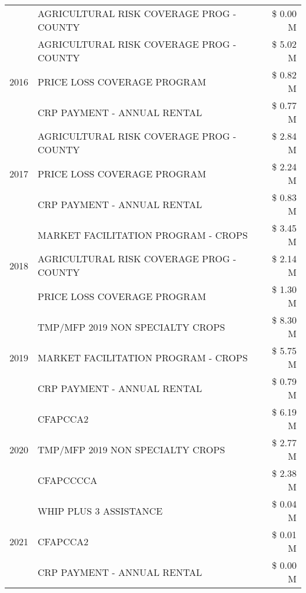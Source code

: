 \begin{tabular}{llr}
 & AGRICULTURAL RISK COVERAGE PROG - COUNTY & \$ 0.00 M \\
\cline{1-3}
\multirow[t]{3}{*}{2016} & AGRICULTURAL RISK COVERAGE PROG - COUNTY      & \$ 5.02 M \\
 & PRICE LOSS COVERAGE PROGRAM                   & \$ 0.82 M \\
 & CRP PAYMENT - ANNUAL RENTAL                   & \$ 0.77 M \\
\cline{1-3}
\multirow[t]{3}{*}{2017} & AGRICULTURAL RISK COVERAGE PROG - COUNTY & \$ 2.84 M \\
 & PRICE LOSS COVERAGE PROGRAM & \$ 2.24 M \\
 & CRP PAYMENT - ANNUAL RENTAL & \$ 0.83 M \\
\cline{1-3}
\multirow[t]{3}{*}{2018} & MARKET FACILITATION PROGRAM - CROPS & \$ 3.45 M \\
 & AGRICULTURAL RISK COVERAGE PROG - COUNTY & \$ 2.14 M \\
 & PRICE LOSS COVERAGE PROGRAM & \$ 1.30 M \\
\cline{1-3}
\multirow[t]{3}{*}{2019} & TMP/MFP 2019 NON SPECIALTY CROPS & \$ 8.30 M \\
 & MARKET FACILITATION PROGRAM - CROPS & \$ 5.75 M \\
 & CRP PAYMENT - ANNUAL RENTAL & \$ 0.79 M \\
\cline{1-3}
\multirow[t]{3}{*}{2020} & CFAPCCA2 & \$ 6.19 M \\
 & TMP/MFP 2019 NON SPECIALTY CROPS & \$ 2.77 M \\
 & CFAPCCCCA & \$ 2.38 M \\
\cline{1-3}
\multirow[t]{3}{*}{2021} & WHIP PLUS 3 ASSISTANCE & \$ 0.04 M \\
 & CFAPCCA2 & \$ 0.01 M \\
 & CRP PAYMENT - ANNUAL RENTAL & \$ 0.00 M \\
\cline{1-3}
\bottomrule
\end{tabular}

